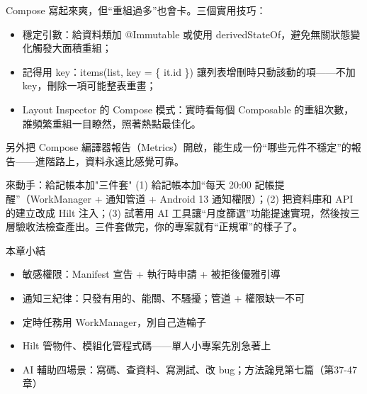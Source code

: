 Compose 寫起來爽，但“重組過多”也會卡。三個實用技巧：

\begin{itemize}
  \item 穩定引數：給資料類加 @Immutable 或使用 derivedStateOf，避免無關狀態變化觸發大面積重組；
  \item 記得用 key：items(list, key = \{ it.id \}) 讓列表增刪時只動該動的項——不加 key，刪除一項可能整表重畫；
  \item Layout Inspector 的 Compose 模式：實時看每個 Composable 的重組次數，誰頻繁重組一目瞭然，照著熱點最佳化。
\end{itemize}

另外把 Compose 編譯器報告（Metrics）開啟，能生成一份“哪些元件不穩定”的報告——進階路上，資料永遠比感覺可靠。

\begin{tcbpractice}{來動手：給記帳本加"三件套"}
(1) 給記帳本加“每天 20:00 記帳提醒”（WorkManager + 通知管道 + Android 13 通知權限）；(2) 把資料庫和 API 的建立改成 Hilt 注入；(3) 試著用 AI 工具讓“月度篩選”功能提速實現，然後按三層驗收法檢查產出。三件套做完，你的專案就有“正規軍”的樣子了。

\end{tcbpractice}

\begin{tcbsummary}{本章小結}
\begin{itemize}
  \item 敏感權限：Manifest 宣告 + 執行時申請 + 被拒後優雅引導
  \item 通知三紀律：只發有用的、能關、不騷擾；管道 + 權限缺一不可
  \item 定時任務用 WorkManager，別自己造輪子
  \item Hilt 管物件、模組化管程式碼——單人小專案先別急著上
  \item AI 輔助四場景：寫碼、查資料、寫測試、改 bug；方法論見第七篇（第37-47章）
\end{itemize}

\end{tcbsummary}
